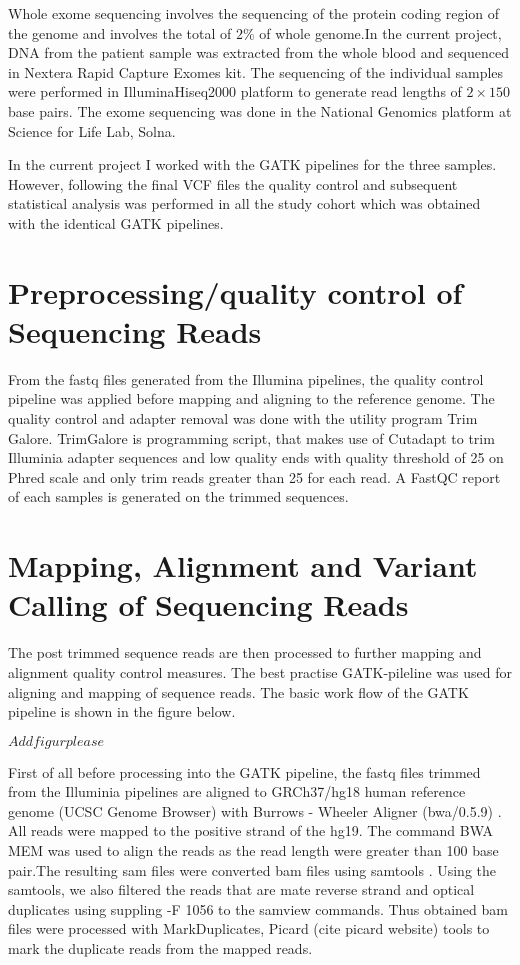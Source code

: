 Whole exome sequencing involves the sequencing of the protein coding region of the genome and involves the total of $2\%$ of whole genome.In the current project, DNA from the patient sample was extracted from the whole blood and sequenced in Nextera\textsuperscript{\textregistered} Rapid Capture Exomes kit. The sequencing of the individual samples  were performed in Illumina\textsuperscript{\textregistered}Hiseq2000 platform to generate read lengths of $2 \times 150$ base pairs. The exome sequencing was done in the National Genomics platform at Science for Life Lab, Solna.

In the current project I worked with the GATK pipelines for the three samples. However, following the final VCF files the quality control and subsequent statistical analysis was performed in all the study cohort which was obtained with the identical GATK pipelines.

\section{Preprocessing/quality control of Sequencing Reads}

From the fastq files generated from the Illumina pipelines, the quality control pipeline was applied before mapping and aligning to the reference genome. The quality control and adapter removal was done with the utility program Trim Galore\cite{TrimGalore}. TrimGalore is programming script, that makes use of Cutadapt \cite{Martin2011Cutadapt} to trim Illuminia adapter sequences and low quality ends with quality threshold of 25 on Phred scale and only trim reads greater than 25 for each read. A FastQC report of each samples is generated on the trimmed sequences.

\section{Mapping, Alignment and Variant Calling of Sequencing Reads}

The post trimmed sequence reads are then processed to further mapping and alignment quality control measures. The best practise GATK-pileline \cite{depristo2011framework} was used for aligning and mapping of sequence reads. The basic work flow of the GATK pipeline is shown in the figure below. 

$  Add figur please $

First of all before processing into the GATK pipeline, the fastq files trimmed from  the Illuminia pipelines are aligned to GRCh37/hg18 human reference genome (UCSC Genome Browser) with Burrows - Wheeler Aligner (bwa/0.5.9) \cite{li2010fast}. All reads were mapped to the positive strand of the hg19. The command BWA MEM was used to align the reads as the read length were greater than 100 base pair.The resulting sam files were converted bam files using samtools \cite{li2010fast}. Using the samtools, we also filtered the reads that are mate reverse strand and optical duplicates using suppling -F 1056 to the samview commands. Thus obtained bam files were processed with MarkDuplicates, Picard (cite picard website) tools to mark the duplicate reads from the mapped reads. 

